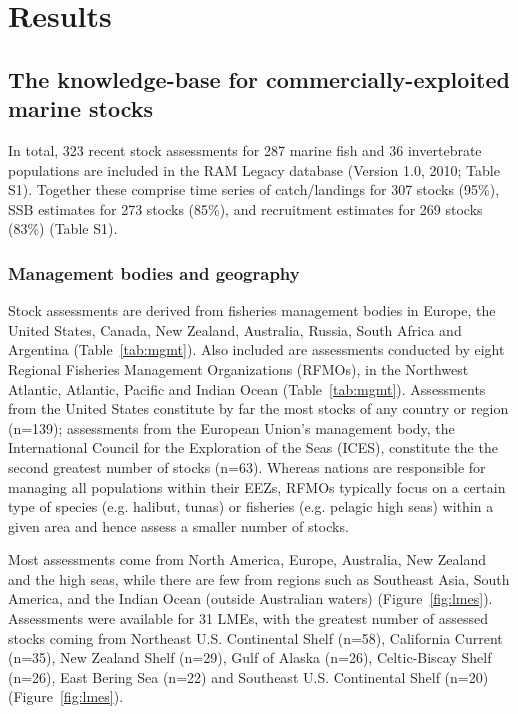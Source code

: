 \newpage
\section*{Results}
\subsection*{The knowledge-base for commercially-exploited marine stocks}
In total, 323 recent stock assessments for
287 marine fish and 36
invertebrate populations are included in the RAM Legacy database
(Version 1.0, 2010; Table S1). Together these comprise time series of
catch/landings for 307 stocks (95\%),
SSB estimates for 273 stocks (85\%), and recruitment estimates for
269 stocks (83\%) (Table S1).

\subsubsection*{Management bodies and geography}
Stock assessments are derived from fisheries management bodies in
Europe, the United States, Canada, New Zealand, Australia, Russia,
South Africa and Argentina (Table~\ref{tab:mgmt}). Also included are
assessments conducted by eight Regional Fisheries Management
Organizations (RFMOs), in the Northwest Atlantic, Atlantic, Pacific
and Indian Ocean (Table~\ref{tab:mgmt}). Assessments from the United
States constitute by far the most stocks of any country or region
(n=139); assessments from the European Union's
management body, the International Council for the Exploration of the
Seas (ICES), constitute the the second greatest number of stocks
(n=63).  Whereas nations are responsible for
managing all populations within their EEZs, RFMOs typically focus on a
certain type of species (e.g.  halibut, tunas) or fisheries (e.g.
pelagic high seas) within a given area and hence assess a smaller
number of stocks.

Most assessments come from North America, Europe, Australia, New
Zealand and the high seas, while there are few from regions such as
Southeast Asia, South America, and the Indian Ocean (outside
Australian waters) (Figure~\ref{fig:lmes}). Assessments were available for 31 LMEs, with the greatest number of
assessed stocks coming from Northeast U.S. Continental Shelf (n=58),
California Current (n=35), New Zealand Shelf (n=29),
Gulf of Alaska (n=26), Celtic-Biscay Shelf (n=26), East Bering Sea (n=22)
and Southeast U.S. Continental Shelf (n=20) (Figure~\ref{fig:lmes}).

